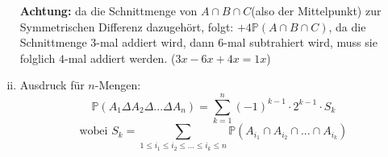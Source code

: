 \begin{uebsp}
\begin{Answer}
\begin{enumerate}[i)]
\begin{multicols}{2}
                \begin{tikzpicture}[scale=0.85]
                    
                \end{tikzpicture}
            \end{multicols}
            
            \textbf{Achtung:} da die Schnittmenge von $A\cap B\cap C$(also der Mittelpunkt) zur Symmetrischen Differenz dazugehört, folgt:
            $+4\mathbb{P}(A\cap B\cap C)$, da die Schnittmenge $3$-mal addiert wird, dann $6$-mal subtrahiert wird, muss sie folglich $4$-mal addiert werden. ($3x-6x+4x=1x$)
        \item Ausdruck für $n$-Mengen:
            \[\mathbb{P}(A_1\Delta A_2\Delta ...\Delta A_n)=\sum_{k=1}^n(-1)^{k-1}\cdot 2^{k-1}\cdot S_k\]
            \[\text{wobei } S_k=\sum_{1\leq i_1\leq i_2\leq ...\leq i_k \leq n}\mathbb{P}(A_{i_1}\cap A_{i_2}\cap ...\cap A_{i_k})\]
    \end{enumerate}
\end{Answer}
\end{uebsp}
